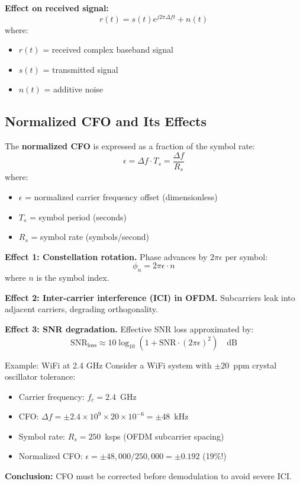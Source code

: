 \textbf{Effect on received signal:}
\begin{equation}
r(t) = s(t) e^{j 2\pi \Delta f t} + n(t)
\end{equation}
where:
\begin{itemize}
\item $r(t)$ = received complex baseband signal
\item $s(t)$ = transmitted signal
\item $n(t)$ = additive noise
\end{itemize}

\subsection{Normalized CFO and Its Effects}

The \textbf{normalized CFO} is expressed as a fraction of the symbol rate:
\begin{equation}
\epsilon = \Delta f \cdot T_s = \frac{\Delta f}{R_s}
\end{equation}
where:
\begin{itemize}
\item $\epsilon$ = normalized carrier frequency offset (dimensionless)
\item $T_s$ = symbol period (seconds)
\item $R_s$ = symbol rate (symbols/second)
\end{itemize}

\textbf{Effect 1: Constellation rotation.} Phase advances by $2\pi\epsilon$ per symbol:
\begin{equation}
\phi_n = 2\pi\epsilon \cdot n
\end{equation}
where $n$ is the symbol index.

\textbf{Effect 2: Inter-carrier interference (ICI) in OFDM.} Subcarriers leak into adjacent carriers, degrading orthogonality.

\textbf{Effect 3: SNR degradation.} Effective SNR loss approximated by:
\begin{equation}
\text{SNR}_{\text{loss}} \approx 10 \log_{10}(1 + \text{SNR} \cdot (2\pi\epsilon)^2) \quad \text{dB}
\end{equation}

\begin{calloutbox}{Example: WiFi at 2.4 GHz}
Consider a WiFi system with $\pm 20$~ppm crystal oscillator tolerance:
\begin{itemize}
\item Carrier frequency: $f_c = 2.4$~GHz
\item CFO: $\Delta f = \pm 2.4 \times 10^9 \times 20 \times 10^{-6} = \pm 48$~kHz
\item Symbol rate: $R_s = 250$~ksps (OFDM subcarrier spacing)
\item Normalized CFO: $\epsilon = \pm 48{,}000 / 250{,}000 = \pm 0.192$ (19\%!)
\end{itemize}
\textbf{Conclusion:} CFO must be corrected before demodulation to avoid severe ICI.
\end{calloutbox}

